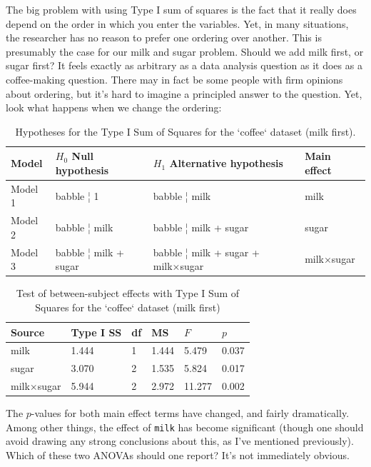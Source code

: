 \documentclass[
  11pt,
  a4paper,
  twoside,symmetric,openright]{book}
\theoremstyle{break}
\theoremstyle{break}
\begin{document}
The big problem with using Type I sum of squares is the fact that it really does depend on the order in which you enter the variables. Yet, in many situations, the researcher has no reason to prefer one ordering over another. This is presumably the case for our milk and sugar problem. Should we add milk first, or sugar first? It feels exactly as arbitrary as a data analysis question as it does as a coffee-making question. There may in fact be some people with firm opinions about ordering, but it's hard to imagine a principled answer to the question. Yet, look what happens when we change the ordering:

\begin{table}[!h]

\caption{\label{tab:unnamed-chunk-94}Hypotheses for the Type I Sum of Squares for the `coffee` dataset (milk first).}
\centering
\begin{tabular}[t]{llll}
\toprule
Model & $H_0$ Null hypothesis & $H_1$ Alternative hypothesis & Main effect\\
\midrule
Model 1 & babble ¦ 1 & babble ¦ milk & milk\\
Model 2 & babble ¦ milk & babble ¦ milk + sugar & sugar\\
Model 3 & babble ¦ milk + sugar & babble ¦ milk + sugar + milk×sugar & milk×sugar\\
\bottomrule
\end{tabular}
\end{table}

\begin{table}[!h]

\caption{\label{tab:unnamed-chunk-95}Test of between-subject effects with Type I Sum of Squares for the `coffee` dataset (milk first)}
\centering
\begin{tabular}[t]{llllll}
\toprule
Source & Type I SS & df & MS & $F$ & $p$\\
\midrule
milk & 1.444 & 1 & 1.444 & 5.479 & 0.037\\
sugar & 3.070 & 2 & 1.535 & 5.824 & 0.017\\
milk×sugar & 5.944 & 2 & 2.972 & 11.277 & 0.002\\
\bottomrule
\end{tabular}
\end{table}

The \(p\)-values for both main effect terms have changed, and fairly dramatically. Among other things, the effect of \texttt{milk} has become significant (though one should avoid drawing any strong conclusions about this, as I've mentioned previously). Which of these two ANOVAs should one report? It's not immediately obvious.
\end{document}
